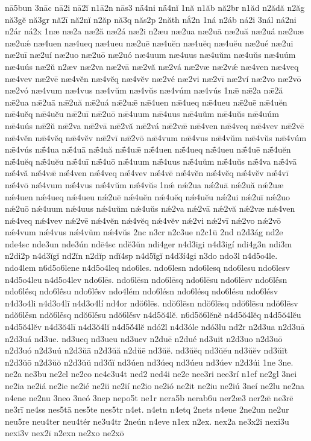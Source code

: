 {nā5bun
3nāc
nā2i
nā2ĭ
n1ā2n
nās3
nā́4ni
nā́4nĭ
1nă
n1ăb
nă2br
n1ăd
n2ădă
n2ăg
nă3gĕ
nă3gr
nă2ī
nă2nĭ
n2ăp
nă3q
năs2p
2năth
nắ2n
1ná
n2áb
ná2i
3nál
ná2ni
n2ár
ná2x
1næ
næ2a
næ2ă
næ2á
næ2i
n2æu
næ2ua
næ2uā
næ2uă
næ2uá
næ2uæ
næ2uǽ
næ4uen
næ4ueq
næ4ueu
næ2uē
næ4uĕn
næ4uĕq
næ4uĕu
næ2ué
næ2ui
næ2uī
næ2uí
næ2uo
næ2uō
næ2uó
næ4uum
næ4uus
næ4uŭm
næ4uŭs
næ4uúm
næ4uús
næ2ŭ
n2æv
næ2va
næ2vā
næ2vă
næ2vá
næ2væ
næ2vǽ
næ4ven
næ4veq
næ4vev
næ2vē
næ4vĕn
næ4vĕq
næ4vĕv
næ2vé
næ2vi
næ2vī
næ2ví
næ2vo
næ2vō
næ2vó
næ4vum
næ4vus
næ4vŭm
næ4vŭs
næ4vúm
næ4vús
1nǣ
nǣ2a
nǣ2ă
nǣ2ua
nǣ2uā
nǣ2uă
nǣ2uá
nǣ2uǣ
nǣ4uen
nǣ4ueq
nǣ4ueu
nǣ2uē
nǣ4uĕn
nǣ4uĕq
nǣ4uĕu
nǣ2uī
nǣ2uō
nǣ4uum
nǣ4uus
nǣ4uŭm
nǣ4uŭs
nǣ4uúm
nǣ4uús
nǣ2ŭ
nǣ2va
nǣ2vā
nǣ2vă
nǣ2vá
nǣ2vǣ
nǣ4ven
nǣ4veq
nǣ4vev
nǣ2vē
nǣ4vĕn
nǣ4vĕq
nǣ4vĕv
nǣ2vī
nǣ2vō
nǣ4vum
nǣ4vus
nǣ4vŭm
nǣ4vŭs
nǣ4vúm
nǣ4vús
nǣ́4ua
nǣ́4uā
nǣ́4uă
nǣ́4uǣ
nǣ́4uen
nǣ́4ueq
nǣ́4ueu
nǣ́4uē
nǣ́4uĕn
nǣ́4uĕq
nǣ́4uĕu
nǣ́4uī
nǣ́4uō
nǣ́4uum
nǣ́4uus
nǣ́4uŭm
nǣ́4uŭs
nǣ́4va
nǣ́4vā
nǣ́4vă
nǣ́4vǣ
nǣ́4ven
nǣ́4veq
nǣ́4vev
nǣ́4vē
nǣ́4vĕn
nǣ́4vĕq
nǣ́4vĕv
nǣ́4vī
nǣ́4vō
nǣ́4vum
nǣ́4vus
nǣ́4vŭm
nǣ́4vŭs
1nǽ
nǽ2ua
nǽ2uā
nǽ2uă
nǽ2uæ
nǽ4uen
nǽ4ueq
nǽ4ueu
nǽ2uē
nǽ4uĕn
nǽ4uĕq
nǽ4uĕu
nǽ2ui
nǽ2uī
nǽ2uo
nǽ2uō
nǽ4uum
nǽ4uus
nǽ4uŭm
nǽ4uŭs
nǽ2va
nǽ2vā
nǽ2vă
nǽ2væ
nǽ4ven
nǽ4veq
nǽ4vev
nǽ2vē
nǽ4vĕn
nǽ4vĕq
nǽ4vĕv
nǽ2vi
nǽ2vī
nǽ2vo
nǽ2vō
nǽ4vum
nǽ4vus
nǽ4vŭm
nǽ4vŭs
2nc
n3cr
n2c3ue
n2c1ū
2nd
n2d3ág
nd2e
nde4sc
nde3un
nde3ún
ndē4sc
ndĕ3ŭn
ndi4ger
n4d3igi
n4d3igí
ndi4g3n
ndi3m
n2di2p
n4d3ĭgĭ
nd2ĭn
n2dĭp
ndĭ4sp
n4d5ĭ́gĭ
n4d3í4gi
n3do
ndo3l
n4d5o4le.
ndo4lem
n6d5o6lene
n4d5o4leq
ndo6les.
ndo6lesn
ndo6lesq
ndo6lesu
ndo6lesv
n4d5o4leu
n4d5o4lev
ndo6lēs.
ndo6lēsn
ndo6lēsq
ndo6lēsu
ndo6lēsv
ndo6lḗsn
ndo6lḗsq
ndo6lḗsu
ndo6lḗsv
ndo4lém
ndo6lésn
ndo6lésq
ndo6lésu
ndo6lésv
n4d3o4li
n4d3o4lī
n4d3o4lí
nd4or
ndŏ6lēs.
ndŏ6lēsn
ndŏ6lēsq
ndŏ6lēsu
ndŏ6lēsv
ndŏ6lḗsn
ndŏ6lḗsq
ndŏ6lḗsu
ndŏ6lḗsv
n4d5ŏ4lĕ.
n6d5ŏ6lĕnĕ
n4d5ŏ4lĕq
n4d5ŏ4lĕu
n4d5ŏ4lĕv
n4d3ŏ4lī
n4d3ŏ4lĭ
n4d5ŏ́4lĕ
ndó2l
n4d3óle
ndó3lu
nd2r
n2d3ua
n2d3uā
n2d3uá
nd3ue.
nd3ueq
nd3ueu
nd3uev
n2duē
n2dué
nd3uit
n2d3uo
n2d3uō
n2d3uó
n2d3uú
n2d3ŭā
n2d3ŭă
n2dŭē
nd3ŭĕ.
nd3ŭĕq
nd3ŭĕu
nd3ŭĕv
nd3ŭĭt
n2d3ŭō
n2d3ŭŏ
n2d3ŭŭ
nd3ŭ́ĭ
nd3úen
nd3úeq
nd3úeu
nd3úev
n2d3úi
1ne
3ne.
ne2a
ne3bu
ne2cl
ne2co
ne4c3u4t
ned2
ned4i
ne2e
nee3ri
nee3rí
n1ef
ne2gl
3nei
ne2ia
ne2iá
ne2ie
ne2ié
ne2ii
ne2ií
ne2io
ne2ió
ne2it
ne2iu
ne2iú
3neí
ne2lu
ne2na
n4ene
ne2nu
3neo
3neó
3nep
nepo5t
ne1r
nera5b
nerab6u
ner2æ3
ner2ǣ
ne3rē
ne3rī
ne4ss
nes5tā
nes5te
nes5tr
n4et.
n4etn
n4etq
2nets
n4eue
2ne2un
ne2ur
neu5re
neu4ter
neu4tér
ne3u4tr
2neún
n4eve
n1ex
n2ex.
nex2a
ne3x2i
nexi3u
nexi3v
nex2ī
n2exn
ne2xo
ne2xō
}
